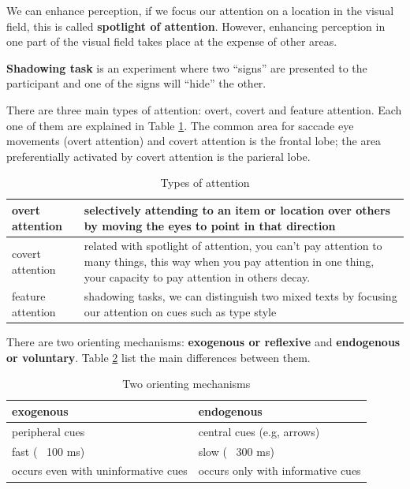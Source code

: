 \documentclass[12pt,article,oneside,a4paper]{memoir}
\begin{document}
We can enhance perception, if we focus our attention on a location in the visual field, this is called \textbf{spotlight of attention}. However, enhancing perception in one part of the visual field takes place at the expense of other areas.

\textbf{Shadowing task} is an experiment where two ``signs'' are presented to the participant and one of the signs will ``hide'' the other.

There are three main types of attention: overt, covert and feature attention. Each one of them are explained in Table \ref{table:types-attention}. The common area for saccade eye movements (overt attention) and covert attention is the frontal lobe; the area preferentially activated by covert attention is the parieral lobe.

\begin{table}
  \begin{tabular}{ p{5cm} |  p{10cm} }
    \hline
    overt attention & selectively attending to an item or location over others by moving the eyes to point in that direction \\ \hline
    covert attention & related with spotlight of attention, you can't pay attention to many things, this way when you pay attention in one thing, your capacity to pay attention in others decay. \\ \hline
    feature attention & shadowing tasks, we can distinguish two mixed texts by focusing our attention on cues such as type style \\ 
    \hline
  \end{tabular}
  \caption{Types of attention}
  \label{table:types-attention}
\end{table}

There are two orienting mechanisms: \textbf{exogenous or reflexive} and \textbf{endogenous or voluntary}. Table \ref{table:orienting-mechanisms} list the main differences between them.

\begin{table}
  \begin{tabular}{ p{8cm} |  p{8cm} }
    \hline
    exogenous & endogenous \\ \hline
	\hline
    peripheral cues & central cues (e.g, arrows) \\ \hline
    fast (~ 100 ms) & slow (~ 300 ms) \\ \hline 
    occurs even with uninformative cues & occurs only with informative cues \\
    \hline
  \end{tabular}
  \caption{Two orienting mechanisms}
  \label{table:orienting-mechanisms}
\end{table}
\end{document}
